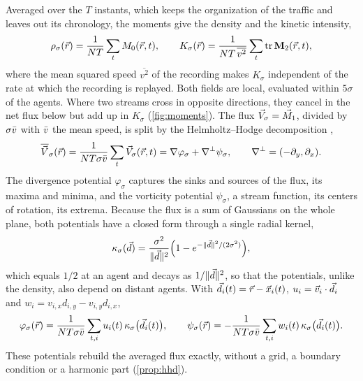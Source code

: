 \documentclass[pdflatex,sn-apa]{sn-jnl}
\begin{document}
Averaged over the $T$ instants, which keeps the organization of the traffic and leaves out its chronology, the moments
give the density and the kinetic intensity,
\begin{equation}
\rho_\sigma(\vec{r})=\frac{1}{NT}\sum_t M_0(\vec{r},t),\qquad
K_\sigma(\vec{r})=\frac{1}{NT\,\overline{v^2}}\sum_t\operatorname{tr}\mathbf{M}_2(\vec{r},t),
\label{eq:density}
\end{equation}
where the mean squared speed $\overline{v^2}$ of the recording makes $K_\sigma$ independent of the rate at which the
recording is replayed. Both fields are local, evaluated within $5\sigma$ of the agents. Where two streams cross in
opposite directions, they cancel in the net flux below but add up in $K_\sigma$ (\cref{fig:moments}). The flux $\vec{V}_\sigma=\vec{M}_1$,
divided by $\sigma\bar v$ with $\bar v$ the mean speed, is split by the Helmholtz--Hodge decomposition
\citep{bhatia2013helmholtz},
\begin{equation}
\overline{\vec{V}}_\sigma(\vec{r})=\frac{1}{NT\sigma\bar v}\sum_t\vec{V}_\sigma(\vec{r},t)=\nabla\varphi_\sigma+\nabla^{\perp}\psi_\sigma,\qquad
\nabla^{\perp}=(-\partial_y,\partial_x).
\label{eq:hhd}
\end{equation}
The divergence potential $\varphi_\sigma$ captures the sinks and sources of the flux, its maxima and minima, and the
vorticity potential $\psi_\sigma$, a stream function, its centers of rotation, its extrema. Because the flux is a sum of
Gaussians on the whole plane, both potentials have a closed form through a single radial kernel,
\begin{equation}
\kappa_\sigma(\vec{d})=\frac{\sigma^2}{\|\vec{d}\|^2}\Big(1-e^{-\|\vec{d}\|^2/(2\sigma^2)}\Big),
\label{eq:kappa}
\end{equation}
which equals $1/2$ at an agent and decays as $1/\|\vec{d}\|^2$, so that the potentials, unlike the density, also depend on
distant agents. With $\vec{d}_i(t)=\vec{r}-\vec{x}_i(t)$, $u_i=\vec{v}_i\cdot\vec{d}_i$ and $w_i=v_{i,x}d_{i,y}-v_{i,y}d_{i,x}$,
\begin{equation}
\varphi_\sigma(\vec{r})=\frac{1}{NT\sigma\bar v}\sum_{t,i}u_i(t)\,\kappa_\sigma\big(\vec{d}_i(t)\big),\qquad
\psi_\sigma(\vec{r})=-\frac{1}{NT\sigma\bar v}\sum_{t,i}w_i(t)\,\kappa_\sigma\big(\vec{d}_i(t)\big).
\label{eq:potentials}
\end{equation}
These potentials rebuild the averaged flux exactly, without a grid, a boundary condition or a harmonic part
(\cref{prop:hhd}).
\end{document}
